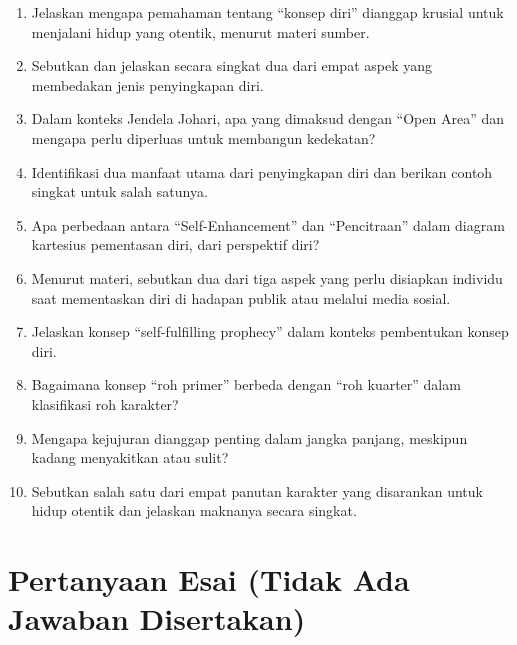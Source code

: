 \documentclass[
  letterpaper,
  DIV=11,
  numbers=noendperiod]{scrreprt}
\providecommand{\tightlist}{%
  \setlength{\itemsep}{0pt}\setlength{\parskip}{0pt}}
\begin{document}
\begin{enumerate}
\def\labelenumi{\arabic{enumi}.}
\tightlist
\item
  Jelaskan mengapa pemahaman tentang ``konsep diri'' dianggap krusial
  untuk menjalani hidup yang otentik, menurut materi sumber.
\item
  Sebutkan dan jelaskan secara singkat dua dari empat aspek yang
  membedakan jenis penyingkapan diri.
\item
  Dalam konteks Jendela Johari, apa yang dimaksud dengan ``Open Area''
  dan mengapa perlu diperluas untuk membangun kedekatan?
\item
  Identifikasi dua manfaat utama dari penyingkapan diri dan berikan
  contoh singkat untuk salah satunya.
\item
  Apa perbedaan antara ``Self-Enhancement'' dan ``Pencitraan'' dalam
  diagram kartesius pementasan diri, dari perspektif diri?
\item
  Menurut materi, sebutkan dua dari tiga aspek yang perlu disiapkan
  individu saat mementaskan diri di hadapan publik atau melalui media
  sosial.
\item
  Jelaskan konsep ``self-fulfilling prophecy'' dalam konteks pembentukan
  konsep diri.
\item
  Bagaimana konsep ``roh primer'' berbeda dengan ``roh kuarter'' dalam
  klasifikasi roh karakter?
\item
  Mengapa kejujuran dianggap penting dalam jangka panjang, meskipun
  kadang menyakitkan atau sulit?
\item
  Sebutkan salah satu dari empat panutan karakter yang disarankan untuk
  hidup otentik dan jelaskan maknanya secara singkat.
\end{enumerate}

\section{Pertanyaan Esai (Tidak Ada Jawaban
Disertakan)}\label{pertanyaan-esai-tidak-ada-jawaban-disertakan}
\end{document}
